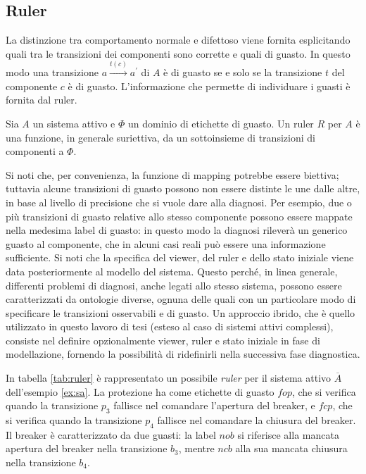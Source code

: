 \subsection{Ruler}
La distinzione tra comportamento normale e difettoso viene fornita esplicitando quali tra le transizioni dei componenti sono corrette e quali di guasto. In questo modo una transizione $a \xrightarrow{t(c)} a^\prime$ di $A$ è di guasto se e solo se la transizione $t$ del componente $c$ è di guasto.
L'informazione che permette di individuare i guasti è fornita dal ruler.
\begin{defn}
Sia $A$ un sistema attivo e $\Phi$ un dominio di etichette di guasto. Un ruler $R$ per $A$ è una funzione, in generale suriettiva, da un sottoinsieme di transizioni di componenti a $\Phi$.
\end{defn}
Si noti che, per convenienza, la funzione di mapping potrebbe essere biettiva; tuttavia alcune transizioni di guasto possono non essere distinte le une dalle altre, in base al livello di precisione che si vuole dare alla diagnosi. Per esempio, due o più transizioni di guasto relative allo stesso componente possono essere mappate nella medesima label di guasto: in questo modo la diagnosi rileverà un generico guasto al componente, che in alcuni casi reali può essere una informazione sufficiente.
Si noti che la specifica del viewer, del ruler e dello stato iniziale viene data posteriormente al modello del sistema. Questo perché, in linea generale, differenti problemi di diagnosi, anche legati allo stesso sistema, possono essere caratterizzati da ontologie diverse, ognuna delle quali con un particolare modo di specificare le transizioni osservabili e di guasto. Un approccio ibrido, che è quello utilizzato in questo lavoro di tesi (esteso al caso di sistemi attivi complessi), consiste nel definire opzionalmente viewer, ruler e stato iniziale in fase di modellazione, fornendo la possibilità di ridefinirli nella successiva fase  diagnostica.

\begin{ex}
In tabella \ref{tab:ruler} è rappresentato un possibile \emph{ruler} per il sistema attivo $\overline{A}$ dell'esempio \ref{ex:sa}. La protezione ha come etichette di guasto $\mathit{fop}$, che si verifica quando la transizione $p_3$ fallisce nel comandare l'apertura del breaker, e $\mathit{fcp}$, che si verifica quando la transizione $p_4$ fallisce nel comandare la chiusura del breaker. 
Il breaker è caratterizzato da due guasti: la label $\mathit{nob}$ si riferisce alla mancata apertura del breaker nella transizione $b_3$, mentre $\mathit{ncb}$ alla sua mancata chiusura nella transizione $b_4$.
\end{ex}

